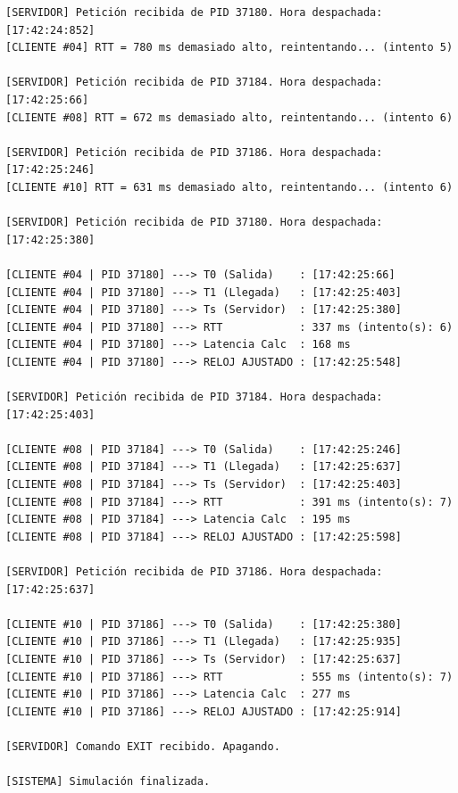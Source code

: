\begin{lstlisting}[style=estiloC]
[SERVIDOR] Petición recibida de PID 37180. Hora despachada: [17:42:24:852]
[CLIENTE #04] RTT = 780 ms demasiado alto, reintentando... (intento 5)

[SERVIDOR] Petición recibida de PID 37184. Hora despachada: [17:42:25:66]
[CLIENTE #08] RTT = 672 ms demasiado alto, reintentando... (intento 6)

[SERVIDOR] Petición recibida de PID 37186. Hora despachada: [17:42:25:246]
[CLIENTE #10] RTT = 631 ms demasiado alto, reintentando... (intento 6)

[SERVIDOR] Petición recibida de PID 37180. Hora despachada: [17:42:25:380]

[CLIENTE #04 | PID 37180] ---> T0 (Salida)    : [17:42:25:66]
[CLIENTE #04 | PID 37180] ---> T1 (Llegada)   : [17:42:25:403]
[CLIENTE #04 | PID 37180] ---> Ts (Servidor)  : [17:42:25:380]
[CLIENTE #04 | PID 37180] ---> RTT            : 337 ms (intento(s): 6)
[CLIENTE #04 | PID 37180] ---> Latencia Calc  : 168 ms
[CLIENTE #04 | PID 37180] ---> RELOJ AJUSTADO : [17:42:25:548]

[SERVIDOR] Petición recibida de PID 37184. Hora despachada: [17:42:25:403]

[CLIENTE #08 | PID 37184] ---> T0 (Salida)    : [17:42:25:246]
[CLIENTE #08 | PID 37184] ---> T1 (Llegada)   : [17:42:25:637]
[CLIENTE #08 | PID 37184] ---> Ts (Servidor)  : [17:42:25:403]
[CLIENTE #08 | PID 37184] ---> RTT            : 391 ms (intento(s): 7)
[CLIENTE #08 | PID 37184] ---> Latencia Calc  : 195 ms
[CLIENTE #08 | PID 37184] ---> RELOJ AJUSTADO : [17:42:25:598]

[SERVIDOR] Petición recibida de PID 37186. Hora despachada: [17:42:25:637]

[CLIENTE #10 | PID 37186] ---> T0 (Salida)    : [17:42:25:380]
[CLIENTE #10 | PID 37186] ---> T1 (Llegada)   : [17:42:25:935]
[CLIENTE #10 | PID 37186] ---> Ts (Servidor)  : [17:42:25:637]
[CLIENTE #10 | PID 37186] ---> RTT            : 555 ms (intento(s): 7)
[CLIENTE #10 | PID 37186] ---> Latencia Calc  : 277 ms
[CLIENTE #10 | PID 37186] ---> RELOJ AJUSTADO : [17:42:25:914]

[SERVIDOR] Comando EXIT recibido. Apagando.

[SISTEMA] Simulación finalizada.
\end{lstlisting}